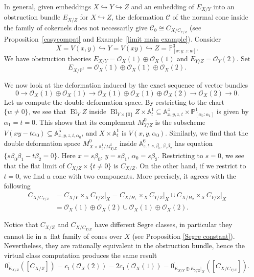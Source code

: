 \documentclass[pdftex]{sigma}
\numberwithin{equation}{section}
\newcommand{\OO}{\mathcal{O}}
\newcommand{\PP}{\mathbb P}
\begin{document}
\begin{Example}\label{nonlimit}In general, given embeddings $X\hookrightarrow Y\hookrightarrow Z$ and an embedding of $E_{X/Y}$ into an obstruction bundle $E_{X/Z}$ for $X\hookrightarrow Z$, the deformation $\mathcal C$ of the normal cone inside the family of cokernels does not necessarily give $\mathcal C_0\cong C_{X/C_{Y/Z}}$ (see Proposition~\ref{easycompat} and Example~\ref{limit main example}).
Consider
 \[
 X=V(x,y)\hookrightarrow Y=V(xy)\hookrightarrow Z=\PP^3_{[x:y:z:w]}.
 \]
We have obstruction theories $E_{X/Y}=\OO_X(1)\oplus\OO_X(1)$ and $E_{Y/Z}=\OO_Y(2)$. Set
\[
E_{X/\PP^3}=\OO_X(1)\oplus\OO_X(1)\oplus\OO_X(2).
\]

We now look at the deformation induced by the exact sequence of vector bundles
 \[
 0\to \OO_X(1)\oplus\OO_X(1)\to\OO_X(1)\oplus\OO_X(1)\oplus\OO_X(2)\to\OO_X(2)\to 0.
 \]
Let us compute the double deformation space. By restricting to the chart $\{w\neq 0\}$, we see that $\operatorname{Bl}_Y Z$ inside $\operatorname{Bl}_{Y\times\{0\}} Z\times\mathbb A^1_t\subseteq \mathbb A^4_{x,y,z,t}\times\PP^1_{[\alpha_0:\alpha_1]}$ is given by $\alpha_1=t=0$. This shows that its complement $M^0_{Y/Z}$ is the subscheme $V(xy-t\alpha_0)\subseteq \mathbb A^5_{x,y,z,t,\alpha_0}$, and $X\times\mathbb A^1_t$ is $V(x,y,\alpha_0)$. Similarly, we find that the double deformation space $M^0_{X\times\mathbb A^1_t/M^0_{Y/Z}}$ inside $\mathbb A^6_{z,t,s,\beta_0,\beta_1\beta_2}$ has equation $\{s\beta_0\beta_1-t\beta_2=0\}$. Here $x=s\beta_0$, $y=s\beta_1$, $\alpha_0=s\beta_2$. Restricting to $s=0$, we see that the flat limit of $C_{X/Z}\times\{t\neq 0\}$ is $C_{X/Z}$. On the other hand, if we restrict to $t=0$, we find a cone with two components. More precisely, it agrees with the following
\begin{align*}
C_{X/C_{Y/Z}}&=C_{X/Y}\times_X C_{Y/Z}\rvert_X =C_{X/H_1}\times_{X} C_{Y/Z}\rvert_{X}\cup C_{X/H_2}\times_{X} C_{Y/Z}\rvert_{X}\\
&=\OO_X(1)\oplus\OO_X(2)\cup \OO_X(1)\oplus\OO_X(2).
\end{align*}

Notice that $C_{X/Z}$ and $C_{X/C_{Y/Z}}$ have different Segre classes, in particular they cannot lie in a~flat family of cones over $X$ (see Proposition \ref{Segre constant}). Nevertheless, they are rationally equivalent in the obstruction bundle, hence the virtual class computation produces the same result
\[0^!_{E_{X/Z}}([C_{X/Z}])=c_1(\OO_X(2))=2 c_1(\OO_X(1))=0^!_{E_{X/Y}\oplus E_{Y/Z}\rvert_X}([C_{X/C_{Y/Z}}]).
\]
\end{Example}
\end{document}
